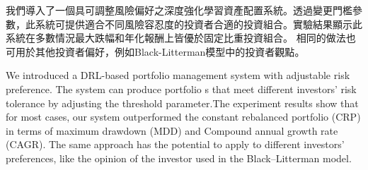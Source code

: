 \begin{abstractzh}
我們導入了一個具可調整風險偏好之深度強化學習資產配置系統。透過變更門檻參數，此系統可提供適合不同風險容忍度的投資者合適的投資組合。實驗結果顯示此系統在多數情況最大跌幅和年化報酬上皆優於固定比重投資組合。
相同的做法也可用於其他投資者偏好，例如Black-Litterman模型中的投資者觀點\cite{black1992global}。 

\end{abstractzh}

\begin{abstracten}
We introduced a DRL-based portfolio management system with adjustable risk preference. The system can produce portfolio s that meet different investors' risk tolerance by adjusting the threshold parameter.The experiment results show that for most cases, our system outperformed the constant rebalanced portfolio (CRP) in terms of maximum drawdown (MDD) and Compound annual growth rate (CAGR). The same approach has the potential to apply to different investors' preferences, like the opinion of the investor used in the Black–Litterman model\cite{black1992global}. 
\end{abstracten}


